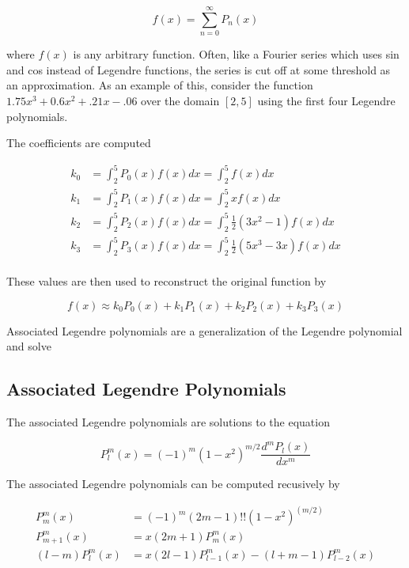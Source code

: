 \documentclass{article}
\numberwithin{equation}{subsection}
\begin{document}
\begin{equation}
f(x) = \sum_{n=0}^\infty P_n(x)
\end{equation}

where $f(x)$ is any arbitrary function. Often, like a Fourier series which uses sin and cos instead of Legendre functions, the series is cut off at some threshold as an approximation. As an example of this, consider the function $1.75x^3 + 0.6x^2+.21x-.06$ over the domain $[2,5]$ using the first four Legendre polynomials.

The coefficients are computed

\begin{align}
k_0 &= \int_2^5 P_0(x) f(x) dx = \int_2^5  f(x) dx\\
k_1 &= \int_2^5 P_1(x) f(x) dx = \int_2^5 x f(x) dx\\
k_2 &= \int_2^5 P_2(x) f(x) dx = \int_2^5 \frac{1}{2}(3x^2-1) f(x) dx\\
k_3 &= \int_2^5 P_3(x) f(x) dx = \int_2^5 \frac{1}{2}(5x^3 - 3x) f(x) dx\\
\end{align}

These values are then used to reconstruct the original function by

\begin{equation}
f(x) \approx k_0 P_0(x) + k_1 P_1(x) + k_2 P_2(x) + k_3 P_3(x)
\end{equation}


Associated Legendre polynomials are a generalization of the Legendre polynomial and solve 

\subsection{Associated Legendre Polynomials}\label{sec:assoc_leg}

The associated Legendre polynomials are solutions to the equation 

\begin{equation}
P_l^m(x) = (-1)^m(1-x^2)^{m/2}\frac{d^m P_l(x)}{dx^m}
\end{equation}

The associated Legendre polynomials can be computed recusively by

\begin{align}
P_m^m(x) &= (-1)^m(2m-1)!!(1-x^2)^(m/2) \\
P_{m+1}^m(x) &= x(2m+1)P_m^m(x) \\
(l-m) P_l^m(x) &= x(2l-1)P_{l-1}^m(x) - (l+m-1)P_{l-2}^m(x)
\end{align}
\end{document}
